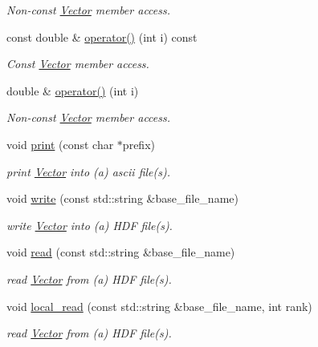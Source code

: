 \begin{DoxyCompactItemize}
\begin{DoxyCompactList}\small\item\em Non-\/const \hyperlink{class_c_a_r_o_m_1_1_vector}{Vector} member access. \end{DoxyCompactList}\item 
const double \& \hyperlink{class_c_a_r_o_m_1_1_vector_a0395f0c266a3e237573b3a8c483f2693}{operator()} (int i) const 
\begin{DoxyCompactList}\small\item\em Const \hyperlink{class_c_a_r_o_m_1_1_vector}{Vector} member access. \end{DoxyCompactList}\item 
double \& \hyperlink{class_c_a_r_o_m_1_1_vector_af30be05120dabaa00932c9276df5d55c}{operator()} (int i)
\begin{DoxyCompactList}\small\item\em Non-\/const \hyperlink{class_c_a_r_o_m_1_1_vector}{Vector} member access. \end{DoxyCompactList}\item 
void \hyperlink{class_c_a_r_o_m_1_1_vector_a73fc052af63b99e06e9315c72727a0ee}{print} (const char $\ast$prefix)
\begin{DoxyCompactList}\small\item\em print \hyperlink{class_c_a_r_o_m_1_1_vector}{Vector} into (a) ascii file(s). \end{DoxyCompactList}\item 
void \hyperlink{class_c_a_r_o_m_1_1_vector_a8eeaff9eedc7ab261577670e98f356c3}{write} (const std\-::string \&base\-\_\-file\-\_\-name)
\begin{DoxyCompactList}\small\item\em write \hyperlink{class_c_a_r_o_m_1_1_vector}{Vector} into (a) H\-D\-F file(s). \end{DoxyCompactList}\item 
void \hyperlink{class_c_a_r_o_m_1_1_vector_a2b38fbc6b7d898bcc0399e1380a436d3}{read} (const std\-::string \&base\-\_\-file\-\_\-name)
\begin{DoxyCompactList}\small\item\em read \hyperlink{class_c_a_r_o_m_1_1_vector}{Vector} from (a) H\-D\-F file(s). \end{DoxyCompactList}\item 
void \hyperlink{class_c_a_r_o_m_1_1_vector_adc03e6513482466f5d3367d8e54dce4f}{local\-\_\-read} (const std\-::string \&base\-\_\-file\-\_\-name, int rank)
\begin{DoxyCompactList}\small\item\em read \hyperlink{class_c_a_r_o_m_1_1_vector}{Vector} from (a) H\-D\-F file(s). \end{DoxyCompactList}\end{DoxyCompactItemize}


